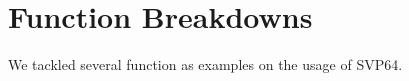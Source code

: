 %

\chapter{Function Breakdowns}

We tackled several function as examples on the usage of \acrshort{SVP64}.




